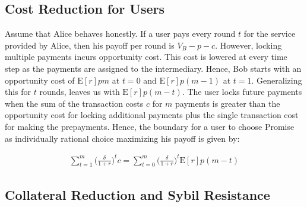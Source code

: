 \documentclass[runningheads]{llncs}
\newcommand{\sys}{Promise\xspace}
\begin{document}

\subsection{Cost Reduction for Users}
Assume that Alice behaves honestly.
If a user pays every round $t$ for the service provided by Alice, then his payoff per round is $V_B - p - c$. %
However, locking multiple payments incurs opportunity cost.
This cost is lowered at every time step as the payments are assigned to the intermediary.
Hence, Bob starts with an opportunity cost of $\mathrm{E}[r]pm$ at $t=0$ and $\mathrm{E}[r]p(m-1)$ at $t=1$.
Generalizing this for $t$ rounds, leaves us with $\mathrm{E}[r]p(m-t)$. %
The user locks future payments when the sum of the transaction costs $c$ for $m$ payments is greater than the opportunity cost for locking additional payments plus the single transaction cost for making the prepayments.
Hence, the boundary for a user to choose \sys as individually rational choice maximizing his payoff is given by:

\begin{align}
\label{eq:decision-bound-user}
    \sum_{t=1}^m \big( \frac{\delta}{1+r} \big)^t c = \sum_{t=0}^m \big( \frac{\delta}{1+r} \big)^t \mathrm{E}[r]p(m-t)
\end{align}


\subsection{Collateral Reduction and Sybil Resistance}
\end{document}

